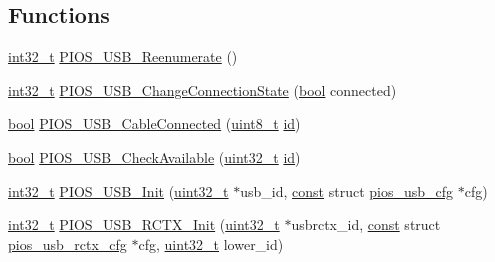 \subsection*{Functions}
\begin{DoxyCompactItemize}
\item 
\hyperlink{group___n_a_m_e_gafd12020da5a235dfcf0c3c748fb5baed}{int32\-\_\-t} \hyperlink{group___p_i_o_s___u_s_b_ga45bd0a1ecf523ffdf65fc78cbf8574ea}{P\-I\-O\-S\-\_\-\-U\-S\-B\-\_\-\-Reenumerate} ()
\item 
\hyperlink{group___n_a_m_e_gafd12020da5a235dfcf0c3c748fb5baed}{int32\-\_\-t} \hyperlink{group___p_i_o_s___u_s_b_gaa1c6f1779e0397ed1637e700c04d6309}{P\-I\-O\-S\-\_\-\-U\-S\-B\-\_\-\-Change\-Connection\-State} (\hyperlink{group___exported__types_gaf6a258d8f3ee5206d682d799316314b1}{bool} connected)
\item 
\hyperlink{group___exported__types_gaf6a258d8f3ee5206d682d799316314b1}{bool} \hyperlink{group___p_i_o_s___u_s_b_gaf085b2e125dd44d34217829ffe283694}{P\-I\-O\-S\-\_\-\-U\-S\-B\-\_\-\-Cable\-Connected} (\hyperlink{stdint_8h_aba7bc1797add20fe3efdf37ced1182c5}{uint8\-\_\-t} \hyperlink{group___u_a_v_gabaabdc509cdaba7df9f56c6c76f3ae19}{id})
\item 
\hyperlink{group___exported__types_gaf6a258d8f3ee5206d682d799316314b1}{bool} \hyperlink{group___p_i_o_s___u_s_b_gab421c578c5d8da4eff14b6ce21c0cb5f}{P\-I\-O\-S\-\_\-\-U\-S\-B\-\_\-\-Check\-Available} (\hyperlink{stdint_8h_a435d1572bf3f880d55459d9805097f62}{uint32\-\_\-t} \hyperlink{group___u_a_v_gabaabdc509cdaba7df9f56c6c76f3ae19}{id})
\item 
\hyperlink{group___n_a_m_e_gafd12020da5a235dfcf0c3c748fb5baed}{int32\-\_\-t} \hyperlink{group___p_i_o_s___u_s_b_ga462c4ceef5cdec4df10b00b90dbc0735}{P\-I\-O\-S\-\_\-\-U\-S\-B\-\_\-\-Init} (\hyperlink{stdint_8h_a435d1572bf3f880d55459d9805097f62}{uint32\-\_\-t} $\ast$usb\-\_\-id, \hyperlink{group___n_a_m_e_ga7ae6d0e43244213b34de2c2b9aa30da6}{const} struct \hyperlink{structpios__usb__cfg}{pios\-\_\-usb\-\_\-cfg} $\ast$cfg)
\item 
\hyperlink{group___n_a_m_e_gafd12020da5a235dfcf0c3c748fb5baed}{int32\-\_\-t} \hyperlink{group___p_i_o_s___u_s_b_ga335e2cdbbb185681f189b0f030bd712c}{P\-I\-O\-S\-\_\-\-U\-S\-B\-\_\-\-R\-C\-T\-X\-\_\-\-Init} (\hyperlink{stdint_8h_a435d1572bf3f880d55459d9805097f62}{uint32\-\_\-t} $\ast$usbrctx\-\_\-id, \hyperlink{group___n_a_m_e_ga7ae6d0e43244213b34de2c2b9aa30da6}{const} struct \hyperlink{structpios__usb__rctx__cfg}{pios\-\_\-usb\-\_\-rctx\-\_\-cfg} $\ast$cfg, \hyperlink{stdint_8h_a435d1572bf3f880d55459d9805097f62}{uint32\-\_\-t} lower\-\_\-id)

\end{DoxyCompactItemize}
